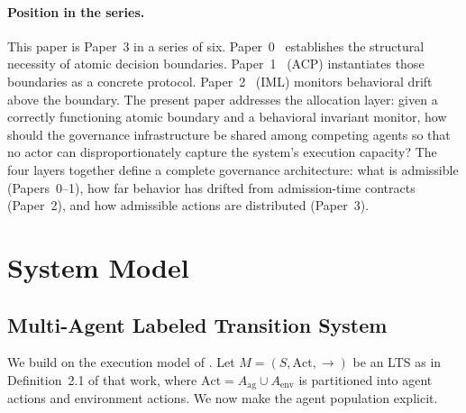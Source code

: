 \documentclass[11pt]{article}
\theoremstyle{plain}
\theoremstyle{definition}
\theoremstyle{remark}
\begin{document}
\paragraph{Position in the series.}
This paper is Paper~3 in a series of six.  Paper~0~\citep{fernandez2026a}
establishes the structural necessity of atomic decision boundaries.
Paper~1~\citep{fernandez2026b} (ACP) instantiates those boundaries as a
concrete protocol.  Paper~2~\citep{fernandez2026c} (IML) monitors
behavioral drift above the boundary.  The present paper addresses the
allocation layer: given a correctly functioning atomic boundary and a
behavioral invariant monitor, how should the governance infrastructure
be shared among competing agents so that no actor can disproportionately
capture the system's execution capacity?
The four layers together define a complete governance architecture: what
is admissible (Papers~0--1), how far behavior has drifted from
admission-time contracts (Paper~2), and how admissible actions are
distributed (Paper~3).

\section{System Model}
\label{sec:model}

%
%

\subsection{Multi-Agent Labeled Transition System}
\label{sec:mamodel}

We build on the execution model of \citet{fernandez2026a}.  Let
$M = (S, \mathrm{Act}, {\to})$ be an LTS as in Definition~2.1 of
that work, where $\mathrm{Act} = A_{\mathrm{ag}} \cup A_{\mathrm{env}}$
is partitioned into agent actions and environment actions.  We now
make the agent population explicit.
\end{document}
